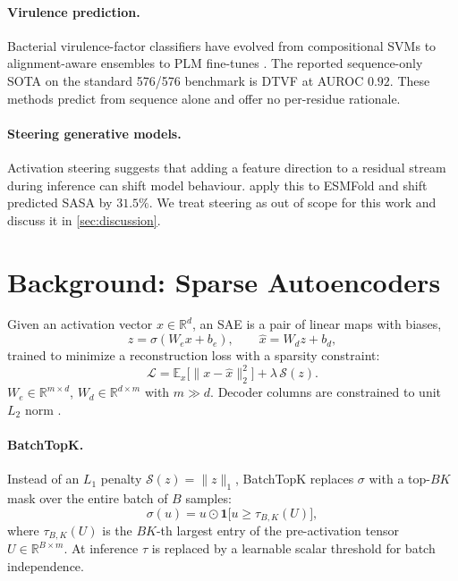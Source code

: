 \documentclass{article}
\theoremstyle{plain}
\theoremstyle{definition}
\theoremstyle{remark}
\begin{document}
\paragraph{Virulence prediction.} Bacterial virulence-factor classifiers have evolved from compositional SVMs \cite{garg2008virulentpred} to alignment-aware ensembles \cite{singh2024vfpred} to PLM fine-tunes \cite{sun2024dtvf,chen2025virulenthunter}. The reported sequence-only SOTA on the standard 576/576 benchmark is DTVF \cite{sun2024dtvf} at AUROC $0.92$. These methods predict from sequence alone and offer no per-residue rationale.

\paragraph{Steering generative models.} Activation steering \cite{turner2023activationaddition,li2023inferencetime,templeton2024scaling} suggests that adding a feature direction to a residual stream during inference can shift model behaviour. \citet{parsan2025interpretable} apply this to ESMFold and shift predicted SASA by $31.5\%$. We treat steering as out of scope for this work and discuss it in \cref{sec:discussion}.

\section{Background: Sparse Autoencoders}
\label{sec:background}

Given an activation vector $x \in \mathbb{R}^{d}$, an SAE is a pair of linear maps with biases,
\begin{equation}
    z = \sigma(W_e x + b_e), \qquad \hat{x} = W_d z + b_d,
\end{equation}
trained to minimize a reconstruction loss with a sparsity constraint:
\begin{equation}
    \mathcal{L} = \mathbb{E}_x \big[\|x - \hat{x}\|_2^2\big] + \lambda \, \mathcal{S}(z).
\end{equation}
$W_e \in \mathbb{R}^{m \times d}$, $W_d \in \mathbb{R}^{d \times m}$ with $m \gg d$. Decoder columns are constrained to unit $L_2$ norm \cite{bricken2023monosemanticity}.

\paragraph{BatchTopK.} Instead of an $L_1$ penalty $\mathcal{S}(z) = \|z\|_1$, BatchTopK \cite{bussmann2024batchtopk} replaces $\sigma$ with a top-$BK$ mask over the entire batch of $B$ samples:
\begin{equation}
    \sigma(u) = u \odot \mathbf{1}\!\big[u \geq \tau_{B,K}(U)\big],
\end{equation}
where $\tau_{B,K}(U)$ is the $BK$-th largest entry of the pre-activation tensor $U \in \mathbb{R}^{B \times m}$. At inference $\tau$ is replaced by a learnable scalar threshold for batch independence.
\end{document}
